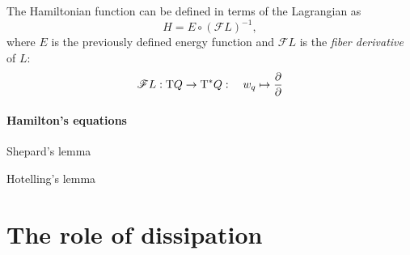 The Hamiltonian function can be defined in terms of the Lagrangian as \cite{Abraham1978}
\begin{equation}
    H = E \circ (\mathscr{F}L)^{-1},
\end{equation}
where $E$ is the previously defined energy function and $\mathscr{F}L$ is the \emph{fiber derivative} of $L$:
\begin{equation}
    \mathscr{F}L: \mathrm{T}Q \to \mathrm{T}^*Q: \quad w_q \mapsto \pdv{}
\end{equation}
\paragraph{Hamilton's equations}
Shepard's lemma

Hotelling's lemma

\section{The role of dissipation}



